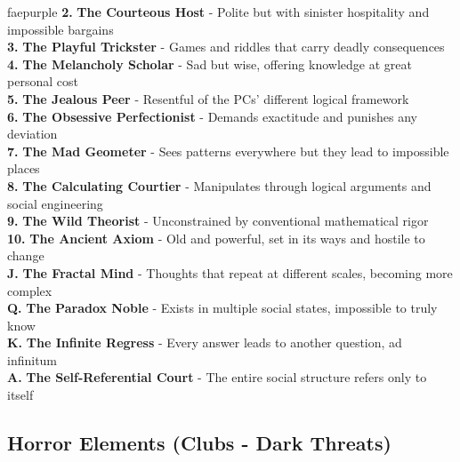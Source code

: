 \documentclass[11pt]{article}
\begin{document}
\begin{campaignsection}{faepurple}
\textbf{2.} \textbf{The Courteous Host} - Polite but with sinister hospitality and impossible bargains \\
\textbf{3.} \textbf{The Playful Trickster} - Games and riddles that carry deadly consequences \\
\textbf{4.} \textbf{The Melancholy Scholar} - Sad but wise, offering knowledge at great personal cost \\
\textbf{5.} \textbf{The Jealous Peer} - Resentful of the PCs' different logical framework \\
\textbf{6.} \textbf{The Obsessive Perfectionist} - Demands exactitude and punishes any deviation \\
\textbf{7.} \textbf{The Mad Geometer} - Sees patterns everywhere but they lead to impossible places \\
\textbf{8.} \textbf{The Calculating Courtier} - Manipulates through logical arguments and social engineering \\
\textbf{9.} \textbf{The Wild Theorist} - Unconstrained by conventional mathematical rigor \\
\textbf{10.} \textbf{The Ancient Axiom} - Old and powerful, set in its ways and hostile to change \\
\textbf{J.} \textbf{The Fractal Mind} - Thoughts that repeat at different scales, becoming more complex \\
\textbf{Q.} \textbf{The Paradox Noble} - Exists in multiple social states, impossible to truly know \\
\textbf{K.} \textbf{The Infinite Regress} - Every answer leads to another question, ad infinitum \\
\textbf{A.} \textbf{The Self-Referential Court} - The entire social structure refers only to itself

\subsection*{Horror Elements (Clubs - Dark Threats)}


\end{campaignsection}
\end{document}
